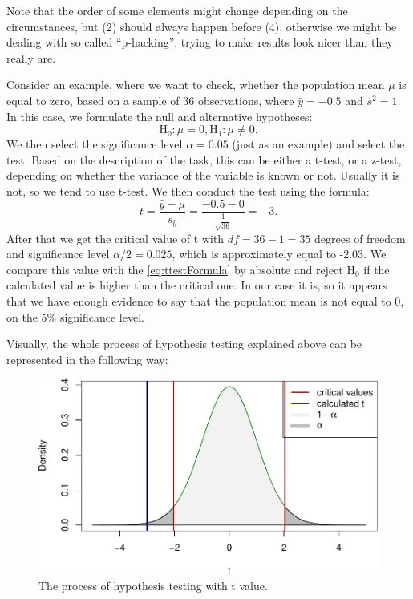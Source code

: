 \documentclass[
]{book}
\theoremstyle{definition}
\theoremstyle{definition}
\theoremstyle{definition}
\theoremstyle{definition}
\theoremstyle{remark}
\begin{document}
Note that the order of some elements might change depending on the circumstances, but (2) should always happen before (4), otherwise we might be dealing with so called ``p-hacking'', trying to make results look nicer than they really are.

Consider an example, where we want to check, whether the population mean \(\mu\) is equal to zero, based on a sample of 36 observations, where \(\bar{y}=-0.5\) and \(s^2=1\). In this case, we formulate the null and alternative hypotheses:
\begin{equation*}
    \mathrm{H}_0: \mu=0, \mathrm{H}_1: \mu \neq 0.
\end{equation*}
We then select the significance level \(\alpha=0.05\) (just as an example) and select the test. Based on the description of the task, this can be either a t-test, or a z-test, depending on whether the variance of the variable is known or not. Usually it is not, so we tend to use t-test. We then conduct the test using the formula:
\begin{equation}
    t = \frac{\bar{y} - \mu}{s_{\bar{y}}} = \frac{-0.5 - 0}{\frac{1}{\sqrt{36}}} = -3 .
    \label{eq:ttestFormula}
\end{equation}
After that we get the critical value of t with \(df=36-1=35\) degrees of freedom and significance level \(\alpha/2=0.025\), which is approximately equal to -2.03. We compare this value with the \eqref{eq:ttestFormula} by absolute and reject \(\mathrm{H}_0\) if the calculated value is higher than the critical one. In our case it is, so it appears that we have enough evidence to say that the population mean is not equal to 0, on the 5\% significance level.

Visually, the whole process of hypothesis testing explained above can be represented in the following way:

\begin{figure}
\centering
\includegraphics{Svetunkov---Statistics-for-Business-Analytics_files/figure-latex/hypothesisTesting01-1.pdf}
\caption{\label{fig:hypothesisTesting01}The process of hypothesis testing with t value.}
\end{figure}
\end{document}
